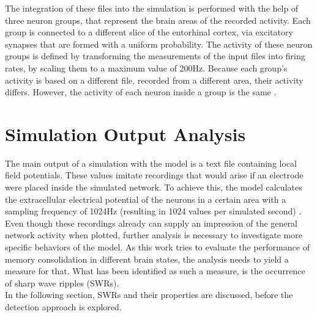    The integration of these files into the simulation is performed with the help of three neuron groups, that represent the brain areas of the recorded activity. Each group is connected to a different slice of the entorhinal cortex, via excitatory synapses that are formed with a uniform probability. The activity of these neuron groups is defined by transforming the measurements of the input files into firing rates, by scaling them to a maximum value of 200Hz. Because each group's activity is based on a different file, recorded from a different area, their activity differs. However, the activity of each neuron inside a group is the same \cite{Aussel.2022} \cite{HippSimModel.1}.
    
    

\section{Simulation Output Analysis}
The main output of a simulation with the model is a text file containing local field potentials. These values imitate recordings that would arise if an electrode were placed inside the simulated network. To achieve this, the model calculates the extracellular electrical potential of the neurons in a certain area with a sampling frequency of 1024Hz (resulting in 1024 values per simulated second) \cite{HippSimModel.2}.\\
Even though these recordings already can supply an impression of the general network activity when plotted, further analysis is necessary to investigate more specific behaviors of the model. As this work tries to evaluate the performance of memory consolidation in different brain states, the analysis needs to yield a measure for that. What has been identified as such a measure, is the occurrence of sharp wave ripples (SWRs).\\
In the following section, SWRs and their properties are discussed, before the detection approach is explored.

